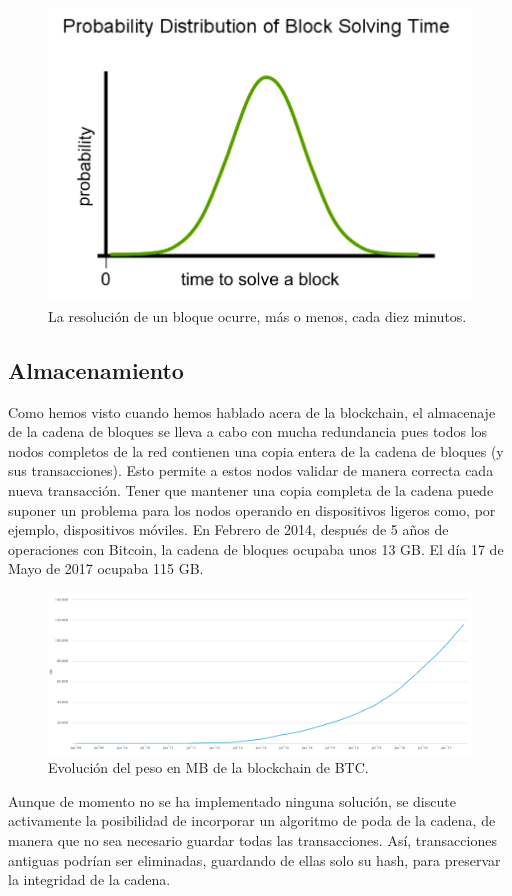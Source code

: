 \documentclass[twoside]{article}
\theoremstyle{definition}
\begin{document}
\begin{figure}[h]
\includegraphics[scale=0.45]{distribution}
\captionsetup{labelformat=empty}
 \caption{La resolución de un bloque ocurre, más o menos, cada diez minutos.}
\end{figure}

\newpage
\subsection{Almacenamiento}
Como hemos visto cuando hemos hablado acera de la blockchain, el almacenaje de la cadena de bloques se lleva a cabo con mucha redundancia pues todos los nodos completos de la red contienen una copia entera de la cadena de bloques (y sus transacciones). Esto permite a estos nodos validar de manera
correcta cada nueva transacción. Tener que mantener una copia completa de la cadena puede suponer un problema para los nodos operando en dispositivos
ligeros como, por ejemplo, dispositivos móviles. En Febrero de 2014, después de 5 años de operaciones con Bitcoin, la cadena de bloques ocupaba unos 13 GB. El día 17 de Mayo de 2017 ocupaba 115 GB.
\begin{figure}[h]
\includegraphics[scale=0.45]{captura}
\captionsetup{labelformat=empty}
 \caption{Evolución del peso en MB de la blockchain de BTC.}
\end{figure}
Aunque de momento no se ha implementado ninguna solución, se discute activamente la posibilidad de incorporar un algoritmo de poda de la cadena, de manera que no sea necesario guardar todas las transacciones. Así, transacciones antiguas podrían ser eliminadas, guardando de ellas solo su hash, para preservar la integridad de la cadena.
\newpage
\end{document}
